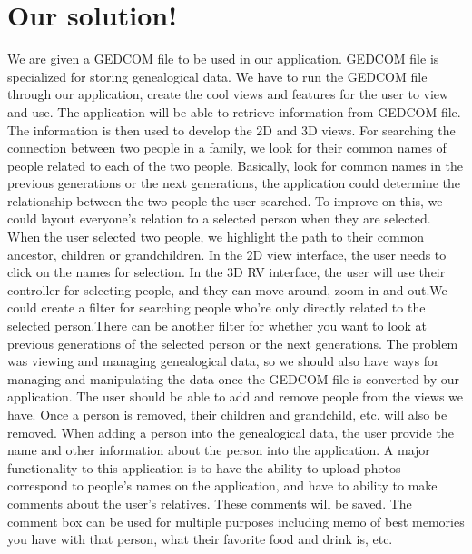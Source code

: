 \documentclass[onecolumn, draftclsnofoot, 10pt, compsoc]{IEEEtran}
\begin{document}
\section{Our solution!}
\begin{singlespace}

We are given a GEDCOM file to be used in our application. GEDCOM file is specialized for storing genealogical data. We have to run the GEDCOM file through our application, create the cool views and features for the user to view and use. The application will be able to retrieve information from GEDCOM file. The information is then used to develop the 2D and 3D views. For searching the connection between two people in a family, we look for their common names of people related to each of the two people. Basically, look for common names in the previous generations or the next generations, the application could determine the relationship between the two people the user searched. To improve on this, we could layout everyone's relation to a selected person when they are selected. When the user selected two people, we highlight the path to their common ancestor, children or grandchildren. In the 2D view interface, the user needs to click on the names for selection. In the 3D RV interface, the user will use their controller for selecting people, and they can move around, zoom in and out.We could create a filter for searching people who're only directly related to the selected person.There can be another filter for whether you want to look at previous generations of the selected person or the next generations. The problem was viewing and managing genealogical data, so we should also have ways for managing and manipulating the data once the GEDCOM file is converted by our application. The user should be able to add and remove people from the views we have. Once a person is removed, their children and grandchild, etc. will also be removed. When adding a person into the genealogical data, the user provide the name and other information about the person into the application. A major functionality to this application is to have the ability to upload photos correspond to people's names on the application, and have to ability to make comments about the user's relatives. These comments will be saved. The comment box can be used for multiple purposes including memo of best memories you have with that person, what their favorite food and drink is, etc.

\end{singlespace}
\end{document}

